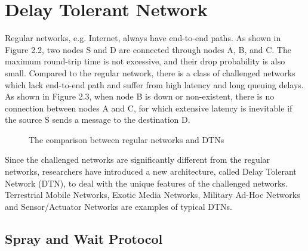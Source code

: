\section{ Delay Tolerant Network}

\noindent Regular networks, e.g. Internet, always have end-to-end paths. As shown in Figure 2.2, two nodes S and D are connected through nodes A, B, and C. The maximum round-trip time is not excessive, and their drop probability is also small. Compared to the regular network, there is a class of challenged networks \cite {C1} which lack end-to-end path and suffer from high latency and long queuing delays. As shown in Figure 2.3, when node B is down or non-existent, there is no connection between nodes A and C, for which extensive latency is inevitable if the source S sends a message to the destination D.

\begin{figure} [H]
  \centering 
  \hspace{1in} 
  \caption{The comparison between regular networks and DTNs} 
  \label{fig:comparison_RN_DTN} %
\end{figure}

\noindent Since the challenged networks are significantly different from the regular networks, researchers have introduced a new architecture, called Delay Tolerant Network (DTN), to deal with the unique features of the challenged networks. Terrestrial Mobile Networks, Exotic Media Networks, Military Ad-Hoc Networks and Sensor/Actuator Networks are examples of typical DTNs.


\subsection{ Spray and Wait Protocol}

